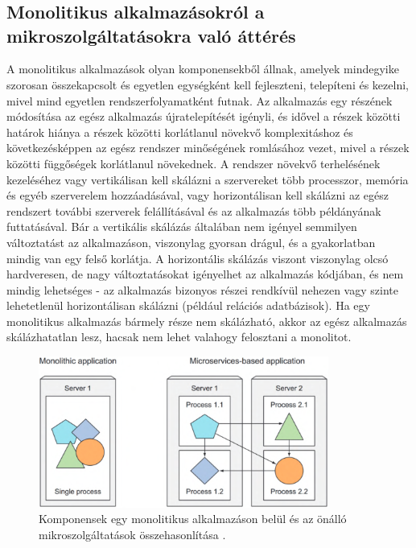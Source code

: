 \chapter{\docker}
\section{Monolitikus alkalmazásokról a mikroszolgáltatásokra való áttérés}
A monolitikus alkalmazások olyan komponensekből állnak, amelyek mindegyike szorosan összekapcsolt és egyetlen egységként kell fejleszteni, telepíteni és kezelni, mivel mind egyetlen rendszerfolyamatként futnak.
Az alkalmazás egy részének módosítása az egész alkalmazás újratelepítését igényli, és idővel a részek közötti határok hiánya a részek közötti korlátlanul növekvő komplexitáshoz és következésképpen az egész rendszer minőségének romlásához vezet, mivel a részek közötti függőségek korlátlanul növekednek.
A rendszer növekvő terhelésének kezeléséhez vagy vertikálisan kell skálázni a szervereket több processzor, memória és egyéb szerverelem hozzáadásával, vagy horizontálisan kell skálázni az egész rendszert további szerverek felállításával és az alkalmazás több példányának futtatásával.
Bár a vertikális skálázás általában nem igényel semmilyen változtatást az alkalmazáson, viszonylag gyorsan drágul, és a gyakorlatban mindig van egy felső korlátja.
A horizontális skálázás viszont viszonylag olcsó hardveresen, de nagy változtatásokat igényelhet az alkalmazás kódjában, és nem mindig lehetséges - az alkalmazás bizonyos részei rendkívül nehezen vagy szinte lehetetlenül horizontálisan skálázni (például relációs adatbázisok).
Ha egy monolitikus alkalmazás bármely része nem skálázható, akkor az egész alkalmazás skálázhatatlan lesz, hacsak nem lehet valahogy felosztani a monolitot.

\begin{figure}[ht]
    \centering
         \includegraphics[width=0.85\textwidth]{figures/docker/monolithic-and-microservices.png}
          \caption{Komponensek egy monolitikus alkalmazáson belül és az önálló mikroszolgáltatások összehasonlítása \cite{Marko17}.}
           \label{monolithic-and-microservices}
\end{figure}

